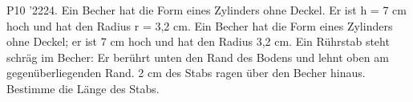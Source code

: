 \documentclass[11pt]{article}
\begin{document}
\begin{pfaufg}{P10 ’22}{\llap{\textasteriskcentered\,}24.}{}
Ein Becher hat die Form eines Zylinders ohne Deckel. Er ist h = 7 cm hoch und hat den Radius r = 3,2 cm. Ein Becher hat die Form eines Zylinders ohne Deckel; er ist 7 cm hoch und hat den Radius 3,2 cm. Ein Rührstab steht schräg im Becher: Er berührt unten den Rand des Bodens und lehnt oben am gegenüberliegenden Rand. 2 cm des Stabs ragen über den Becher hinaus. Bestimme die Länge des Stabs.
\par\smallskip\noindent {}\par
{}
\end{pfaufg}
\end{document}
